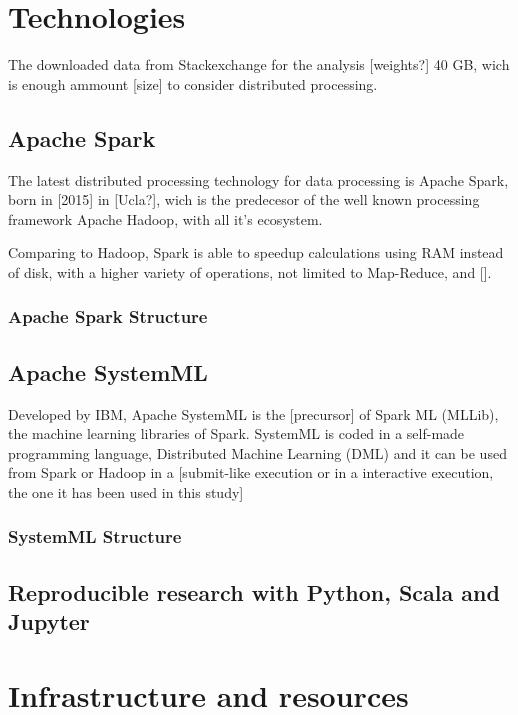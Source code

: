 \documentclass[11pt]{article} %
\begin{document}
\section{Technologies}

The downloaded data from Stackexchange for the analysis [weights?] 40 GB, wich is enough ammount [size] to consider distributed processing.

\subsection{Apache Spark}

The latest distributed processing technology for data processing is Apache Spark, born in [2015] in [Ucla?], wich is the predecesor of the well known processing framework Apache Hadoop, with all it's ecosystem.

Comparing to Hadoop, Spark is able to speedup calculations using RAM instead of disk, with a higher variety of operations, not limited to Map-Reduce,  and [].

\subsubsection{Apache Spark Structure}




\subsection{Apache SystemML}

Developed by IBM, Apache SystemML is the [precursor] of Spark ML (MLLib), the machine learning libraries of Spark.
SystemML is coded in a self-made programming language, Distributed Machine Learning (DML) and it can be used from Spark or Hadoop in a [submit-like execution or in a interactive execution, the one it has been used in this study]

\subsubsection{SystemML Structure}



\subsection{Reproducible research with Python, Scala and Jupyter}



\section{Infrastructure and resources}
\end{document}
